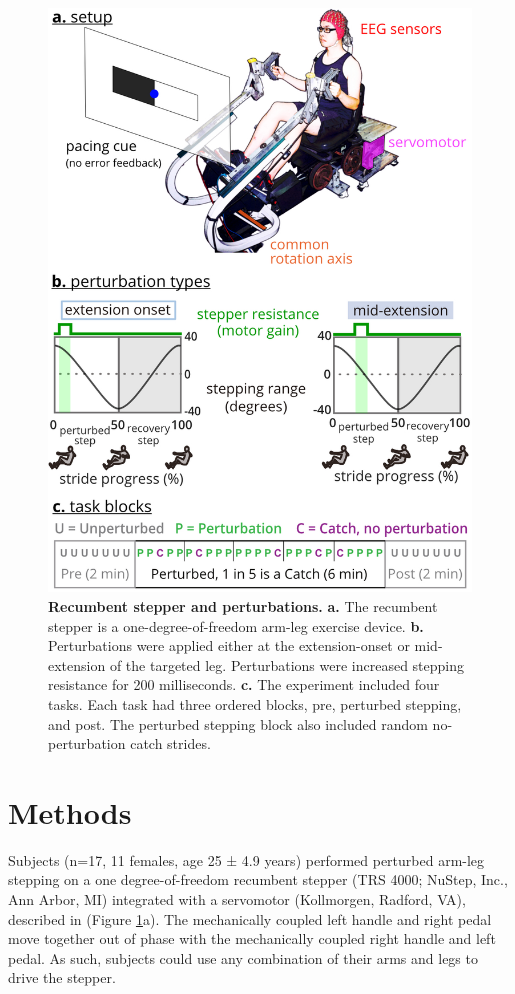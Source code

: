 \documentclass[../thesis_seyed.tex]{subfiles}
\begin{document}
\begin{figure}[!t]
\centerline{\includegraphics{../img/01_device-protocol_errorMetric.jpg}}
\caption{\textbf{Recumbent stepper and perturbations.} \textbf{a.} The recumbent stepper is a one-degree-of-freedom arm-leg exercise device. \textbf{b.} Perturbations were applied either at the extension-onset or mid-extension of the targeted leg. Perturbations were increased stepping resistance for 200 milliseconds. \textbf{c.} The experiment included four tasks. Each task had three ordered blocks, pre, perturbed stepping, and post. The perturbed stepping block also included random no-perturbation catch strides.}
\label{fig:fig1}
\end{figure}

\section{Methods}
\label{sec:methods}
Subjects (n=17, 11 females, age 25 ± 4.9 years) performed perturbed arm-leg stepping on a one degree-of-freedom recumbent stepper {(TRS 4000; NuStep, Inc., Ann Arbor, MI)} integrated with a servomotor {(Kollmorgen, Radford, VA), described in }\cite{Huang2009-of} (Figure \ref{fig:fig1}a). The mechanically coupled left handle and right pedal move together out of phase with the mechanically coupled right handle and left pedal. As such, subjects could use any combination of their arms and legs to drive the stepper.
\end{document}
